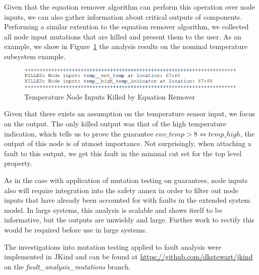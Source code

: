 Given that the equation remover algorithm can perform this operation over node inputs, we can also gather information about critical outputs of components. Performing a similar extention to the equation remover algorithm, we collected all node input mutations that are killed and present them to the user. As an example, we show in Figure~\ref{fig:nodeInputsKilled} the analysis results on the nominal temperature subsystem example. 

\begin{figure}[h]
	\begin{center}
		\includegraphics[scale=0.6]{images/nodeInputsKilled.PNG}
	\end{center}
	\caption{Temperature Node Inputs Killed by Equation Remover}
	\label{fig:nodeInputsKilled}
\end{figure}

Given that there exists an assumption on the temperature sensor input, we focus on the output. The only killed output was that of the high temperature indication, which tells us to prove the guarantee $\mathit{env\_temp} > 8 \iff \mathit{temp\_high}$, the output of this node is of utmost importance. Not surprisingly, when attaching a fault to this output, we get this fault in the minimal cut set for the top level property. 

As in the case with application of mutation testing on guarantees, node inputs also will require integration into the safety annex in order to filter out node inputs that have already been accounted for with faults in the extended system model. In large systems, this analysis is scalable and shows itself to be informative, but the outputs are unwieldy and large. Further work to rectify this would be required before use in large systems. 

The investigations into mutation testing applied to fault analysis were implemented in JKind and can be found at \url{https://github.com/dkstewart/jkind} on the {\em fault\_analysis\_mutations} branch.
